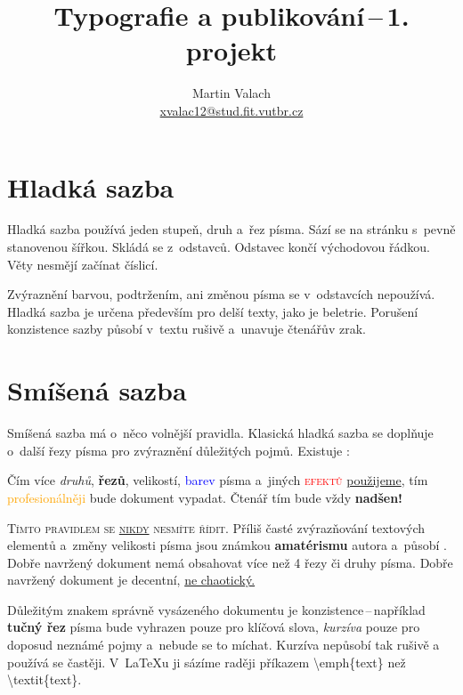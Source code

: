 \documentclass[twocolumn, a4paper, 10pt, notitlepage]{article}
\title{Typografie a publikování\,--\,1. projekt}
\author{Martin Valach \\ \href{mailto:xvalac12@stud.fit.vutbr.cz}{xvalac12@stud.fit.vutbr.cz}}
\date{}
\newcommand{\fontCMTT}[1]{\fontfamily{cmtt}\selectfont #1}
\newcommand{\fontPZC}[1]{\fontfamily{pzc}\selectfont #1}
\begin{document}
\maketitle

\section{Hladká sazba}
Hladká sazba používá jeden stupeň, druh a~řez písma. Sází se na stránku s~pevně stanovenou šířkou. Skládá se z~od\-stav\-ců. Odstavec končí východovou řádkou. Věty nesmějí začínat číslicí.

Zvýraznění barvou, podtržením, ani změnou písma se v~odstavcích nepoužívá. Hladká sazba je určena především pro delší texty, jako je beletrie. Porušení konzistence sazby působí v~textu rušivě a~unavuje čtenářův zrak.

\section{Smíšená sazba} \label{sec:section2}
Smíšená sazba má o~něco volnější pravidla. Klasická hladká sazba se doplňuje o~další řezy písma pro zvýraznění dů\-le\-ži\-tých pojmů. Existuje :
\begin{adjustwidth}{0.7cm}{0.7cm}
    \medskip
    \hspace{\parindent} Čím více \emph{druhů}, \textbf{řezů}, {\huge velikostí}, \textcolor{blue}{barev} písma a~jiných \textcolor{red}{\textsc{efektů}} \underline{použijeme}, tím \textcolor{orange}{profesio\-nál\-ně\-ji} bude {\fontPZC{\Large dokument}} vypadat. {\tiny Čtenář} tím bude vždy \textbf{\Huge nadšen!}
\end{adjustwidth}
\medskip

\textsc{Tímto pravidlem se \underline{nikdy} nesmíte řídit}. Příliš časté zvýrazňování textových elementů a~změny {\tiny velikosti} písma jsou známkou \textbf{amatérismu} autora a~působí {\selectfont{velmi rušivě}}. Dobře navržený dokument nemá obsahovat více než 4 řezy či druhy písma. Dobře navržený dokument je decentní, \underline{ne chaotický.}

Důležitým znakem správně vysázeného dokumentu je konzistence\,--\,například \textbf{tučný řez} písma bude vyhrazen pouze pro klíčová slova, \emph{kurzíva} pouze pro doposud ne\-zná\-mé pojmy a~nebude se to míchat.
Kurzíva nepůsobí tak rušivě a používá se častěji.
V~{\LaTeX}u ji sázíme raději příkazem {\fontCMTT{\textbackslash emph\{text\}}} než {\fontCMTT{\textbackslash textit\{text\}}}.
\end{document}
